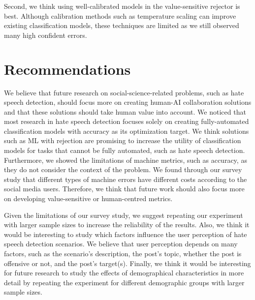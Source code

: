 %
Second, we think using well-calibrated models in the value-sensitive rejector is best.
%
Although calibration methods such as temperature scaling can improve existing classification models, these techniques are limited as we still observed many high confident errors.
%


\section{Recommendations}
\label{sec:discussion-recommendations}
We believe that future research on social-science-related problems, such as hate speech detection, should focus more on creating human-AI collaboration solutions and that these solutions should take human value into account.
%
We noticed that most research in hate speech detection focuses solely on creating fully-automated classification models with accuracy as its optimization target.
%
We think solutions such as ML with rejection are promising to increase the utility of classification models for tasks that cannot be fully automated, such as hate speech detection.
%
Furthermore, we showed the limitations of machine metrics, such as accuracy, as they do not consider the context of the problem.
%
We found through our survey study that different types of machine errors have different costs according to the social media users.
%
Therefore, we think that future work should also focus more on developing value-sensitive or human-centred metrics.
%

%
Given the limitations of our survey study, we suggest repeating our experiment with larger sample sizes to increase the reliability of the results.
%
Also, we think it would be interesting to study which factors influence the user perception of hate speech detection scenarios.
%
We believe that user perception depends on many factors, such as the scenario's description, the post's topic, whether the post is offensive or not, and the post's target(s).
%
Finally, we think it would be interesting for future research to study the effects of demographical characteristics in more detail by repeating the experiment for different demographic groups with larger sample sizes.
%

